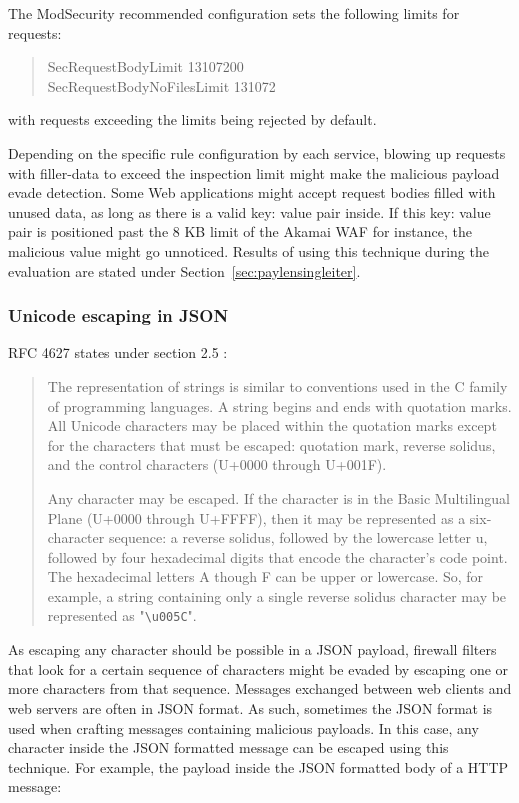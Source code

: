 The ModSecurity recommended configuration sets the following limits for requests:
\begin{quote}
	SecRequestBodyLimit 13107200 \\
	SecRequestBodyNoFilesLimit 131072
\end{quote}
with requests exceeding the limits being rejected by default. \cite{modsec/recconf}

Depending on the specific rule configuration by each service, blowing up requests with filler-data to exceed the inspection limit might make the malicious payload evade detection. Some Web applications might accept request bodies filled with unused data, as long as there is a valid key: value pair inside. If this key: value pair is positioned past the 8 KB limit of the Akamai WAF for instance, the malicious value might go unnoticed. Results of using this technique during the evaluation are stated under Section~\ref{sec:paylensingleiter}.


\subsubsection{Unicode escaping in JSON}
RFC 4627  states under section 2.5 :
\begin{quote}
	The representation of strings is similar to conventions used in the C
	family of programming languages.  A string begins and ends with
	quotation marks.  All Unicode characters may be placed within the
	quotation marks except for the characters that must be escaped:
	quotation mark, reverse solidus, and the control characters (U+0000
	through U+001F).

	Any character may be escaped.  If the character is in the Basic
	Multilingual Plane (U+0000 through U+FFFF), then it may be
	represented as a six-character sequence: a reverse solidus, followed
	by the lowercase letter u, followed by four hexadecimal digits that
	encode the character's code point.  The hexadecimal letters A though
	F can be upper or lowercase.  So, for example, a string containing
	only a single reverse solidus character may be represented as
	"\verb|\u005C|". \cite{rfc4627}
\end{quote}
As escaping any character should be possible in a JSON payload, firewall filters that look for a certain sequence of characters might be evaded by escaping one or more characters from that sequence. Messages exchanged between web clients and web servers are often in JSON format. As such, sometimes the JSON format is used when crafting messages containing malicious payloads. In this case, any character inside the JSON formatted message can be escaped using this technique. For example, the payload inside the JSON formatted body of a HTTP message:

